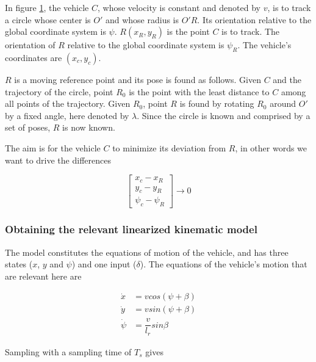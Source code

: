 In figure \ref{fig:circular_mpc}, the vehicle $C$, whose velocity is constant
and denoted by $v$, is to track a circle whose center is $O'$ and whose
radius is $O'R$. Its orientation relative to the global coordinate system is
$\psi$. $R(x_R, y_R)$ is the point $C$ is to track. The orientation of $R$
relative to the global coordinate system is $\psi_R$. The vehicle's coordinates
are $(x_c, y_c)$.


\begin{figure}[H]\centering
  \scalebox{0.8}{}
  \caption{}
  \label{fig:circular_mpc}
\end{figure}

$R$ is a moving reference point and its pose is found as follows. Given $C$ and
the trajectory of the circle, point $R_0$ is the point with the least distance
to $C$ among all points of the trajectory. Given $R_0$, point $R$ is found by
rotating $R_0$ around $O'$ by a fixed angle, here denoted by $\lambda$. Since
the circle is known and comprised by a set of poses, $R$ is now known.

The aim is for the vehicle $C$ to minimize its deviation from $R$, in other
words we want to drive the differences

\begin{equation}
  \begin{bmatrix}
    x_c - x_R \\
    y_c -y_R\\
    \psi_c - \psi_R
  \end{bmatrix}
  \rightarrow 0
\end{equation}

\subsubsection{Obtaining the relevant linearized kinematic model}

The model constitutes the equations of motion of the vehicle, and has three
states ($x$, $y$ and $\psi$) and one input ($\delta$). The equations of the
vehicle's motion that are relevant here are

\begin{align}
  \dot{x} &= v cos(\psi + \beta) \\
  \dot{y} &= v sin(\psi + \beta) \\
  \dot{\psi} &= \dfrac{v}{l_r} sin\beta
\end{align}

Sampling with a sampling time of $T_s$ gives

